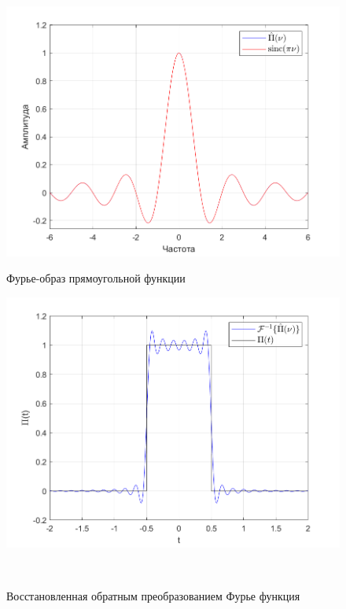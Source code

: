 \documentclass[a4paper]{article}
\begin{document}
\begin{figure}[H]
    \begin{minipage}{0.5\textwidth}
        \centering \includegraphics[width=\textwidth]{graphs/1/T_4_dt_0.001_V_12_dv_0.001/fourier_numerical.png}
        \caption{Фурье-образ прямоугольной функции}
    \end{minipage}\hfill
    \begin{minipage}{0.5\textwidth}
        \centering \includegraphics[width=\textwidth]{graphs/1/T_4_dt_0.001_V_12_dv_0.001/func_inversed_fourier.png}
        \caption{Восстановленная обратным преобразованием Фурье функция}
    \end{minipage}\\[1em]
\end{figure}\noindent\
\end{document}
